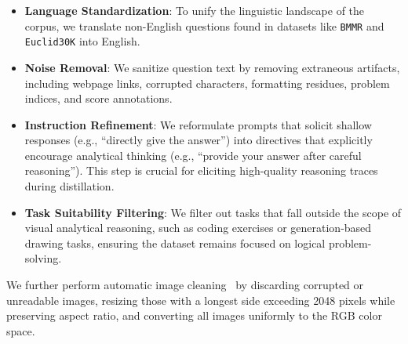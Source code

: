 \begin{itemize}
    \item \textbf{Language Standardization}: To unify the linguistic landscape of the corpus, we translate non-English questions found in datasets like \texttt{BMMR} and \texttt{Euclid30K} into English.
    \item \textbf{Noise Removal}: We sanitize question text by removing extraneous artifacts, including webpage links, corrupted characters, formatting residues, problem indices, and score annotations.
    \item \textbf{Instruction Refinement}: We reformulate prompts that solicit shallow responses (e.g., ``directly give the answer'') into directives that explicitly encourage analytical thinking (e.g., ``provide your answer after careful reasoning''). This step is crucial for eliciting high-quality reasoning traces during distillation.
    \item \textbf{Task Suitability Filtering}: We filter out tasks that fall outside the scope of visual analytical reasoning, such as coding exercises or generation-based drawing tasks, ensuring the dataset remains focused on logical problem-solving.
\end{itemize}

We further perform automatic image cleaning~\cite{finevision} by discarding corrupted or unreadable images, resizing those with a longest side exceeding 2048 pixels while preserving aspect ratio, and converting all images uniformly to the RGB color space.



